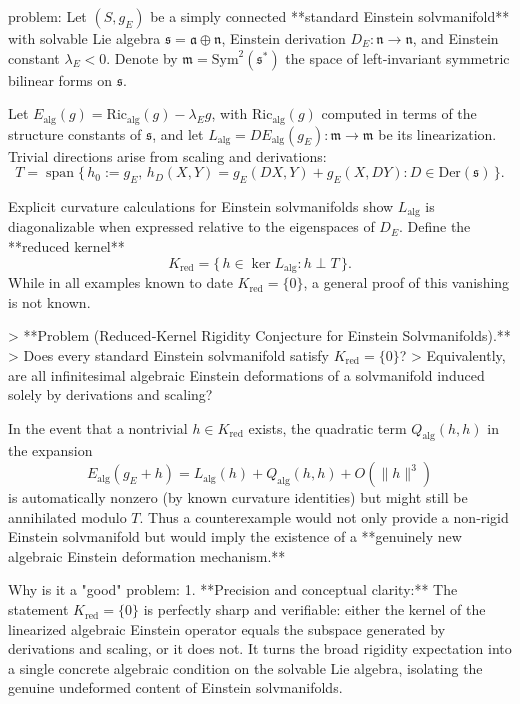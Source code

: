problem:  
Let \( (S,g_E) \) be a simply connected **standard Einstein solvmanifold** with solvable Lie algebra \( \mathfrak{s} = \mathfrak{a} \oplus \mathfrak{n} \), Einstein derivation \( D_E:\mathfrak{n}\to\mathfrak{n} \), and Einstein constant \(\lambda_E<0\).  Denote by \( \mathfrak{m} = \mathrm{Sym}^2(\mathfrak{s}^*) \) the space of left‑invariant symmetric bilinear forms on \(\mathfrak{s}\).  

Let \( E_{\mathrm{alg}}(g) = \mathrm{Ric}_{\mathrm{alg}}(g) - \lambda_E g \), with \( \mathrm{Ric}_{\mathrm{alg}}(g) \) computed in terms of the structure constants of \(\mathfrak{s}\), and let \( L_{\mathrm{alg}} = D E_{\mathrm{alg}}(g_E): \mathfrak{m}\to\mathfrak{m} \) be its linearization.  Trivial directions arise from scaling and derivations:
\[
T = \operatorname{span}\{\, h_0:=g_E,\, h_D(X,Y)=g_E(DX,Y)+g_E(X,DY): D\in \mathrm{Der}(\mathfrak{s}) \,\}.
\]

Explicit curvature calculations for Einstein solvmanifolds show \(L_{\mathrm{alg}}\) is diagonalizable when expressed relative to the eigenspaces of \(D_E\).  Define the **reduced kernel**
\[
K_{\mathrm{red}} = \{\, h\in \ker L_{\mathrm{alg}} : h \perp T \,\}.
\]
While in all examples known to date \(K_{\mathrm{red}}=\{0\}\), a general proof of this vanishing is not known.

> **Problem (Reduced‑Kernel Rigidity Conjecture for Einstein Solvmanifolds).**  
> Does every standard Einstein solvmanifold satisfy \( K_{\mathrm{red}} = \{0\} \)?  
> Equivalently, are all infinitesimal algebraic Einstein deformations of a solvmanifold induced solely by derivations and scaling?  

In the event that a nontrivial \(h\in K_{\mathrm{red}}\) exists, the quadratic term \(Q_{\mathrm{alg}}(h,h)\) in the expansion  
\[
E_{\mathrm{alg}}(g_E+h)=L_{\mathrm{alg}}(h)+Q_{\mathrm{alg}}(h,h)+O(\|h\|^3)
\]
is automatically nonzero (by known curvature identities) but might still be annihilated modulo \(T\). Thus a counterexample would not only provide a non‑rigid Einstein solvmanifold but would imply the existence of a **genuinely new algebraic Einstein deformation mechanism.**

Why is it a "good" problem:  
1. **Precision and conceptual clarity:**  
   The statement \(K_{\mathrm{red}}=\{0\}\) is perfectly sharp and verifiable: either the kernel of the linearized algebraic Einstein operator equals the subspace generated by derivations and scaling, or it does not.  It turns the broad rigidity expectation into a single concrete algebraic condition on the solvable Lie algebra, isolating the genuine undeformed content of Einstein solvmanifolds.

